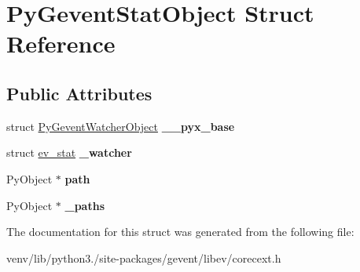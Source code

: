 \hypertarget{struct_py_gevent_stat_object}{}\section{Py\+Gevent\+Stat\+Object Struct Reference}
\label{struct_py_gevent_stat_object}
\subsection*{Public Attributes}
\begin{DoxyCompactItemize}
\item 
\mbox{\label{struct_py_gevent_stat_object_a61cac275af5a1c3779bd97decd192e6c}} 
struct \hyperlink{struct_py_gevent_watcher_object}{Py\+Gevent\+Watcher\+Object} {\bfseries \+\_\+\+\_\+pyx\+\_\+base}
\item 
\mbox{\label{struct_py_gevent_stat_object_aac2d49150b18d1fe210b7f31350e9c4d}} 
struct \hyperlink{structev__stat}{ev\+\_\+stat} {\bfseries \+\_\+watcher}
\item 
\mbox{\label{struct_py_gevent_stat_object_ad56aa116f20823cb1c85be1e3d05bb8a}} 
Py\+Object $\ast$ {\bfseries path}
\item 
\mbox{\label{struct_py_gevent_stat_object_aaf368795788fe42eeb6be4a2202d1270}} 
Py\+Object $\ast$ {\bfseries \+\_\+paths}
\end{DoxyCompactItemize}


The documentation for this struct was generated from the following file\+:\begin{DoxyCompactItemize}
\item 
venv/lib/python3./site-\/packages/gevent/libev/corecext.\+h\end{DoxyCompactItemize}
